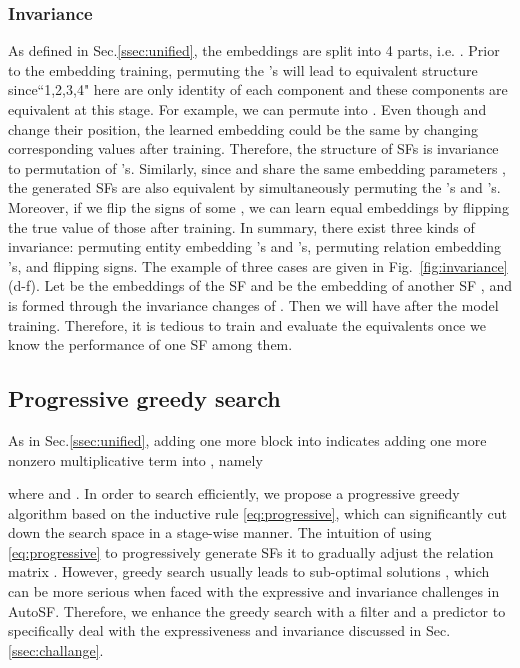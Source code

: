 \documentclass[conference]{IEEEtran}
\begin{document}
\subsubsection{Invariance}
As defined in Sec.\ref{ssec:unified},
the embeddings are split into 4 parts, i.e.
.
Prior to the embedding training,
permuting the 's will lead to equivalent structure 
since``1,2,3,4" here are only identity of each component
and these components are equivalent at this stage.
For example, we can permute  into .
Even though  and  change their position,
the learned embedding could be the same by changing corresponding values after training.
Therefore, the structure of SFs is invariance to permutation of 's.
Similarly,
since  and  share the same embedding parameters , 
the generated SFs are also equivalent by simultaneously permuting the 's and 's.
Moreover, if we flip the signs of some ,
we can learn equal embeddings by flipping the true value of  those  after training.
In summary,
there exist three kinds of invariance: 
permuting entity embedding 's and 's,
permuting relation embedding 's, 
and flipping signs.
The example of three cases are given in Fig.~\ref{fig:invariance}(d-f).
Let  be the embeddings of the SF 
 and  be the embedding of another SF ,
 and  is formed through the invariance changes of .
 Then we will have  
 after the model training.
 Therefore,
it is tedious to train and evaluate the equivalents once we know the performance of one SF among them.


\subsection{Progressive greedy search}
\label{ssec:greedy}

As in Sec.\ref{ssec:unified},
adding one more block into  indicates adding
one more nonzero multiplicative term into ,
namely

where  and .
In order to search efficiently, 
we propose a progressive greedy algorithm based on the inductive rule \eqref{eq:progressive},
which can significantly cut down the search space in a stage-wise manner.
The intuition of using \eqref{eq:progressive} to progressively generate SFs it to
gradually adjust the relation matrix .
However,
greedy search usually leads to sub-optimal solutions \cite{tropp2004greed},
which can be more serious when faced with the expressive and invariance challenges in AutoSF. 
Therefore,
we enhance the greedy search with a filter and a predictor
to specifically deal with  the expressiveness and invariance
discussed in Sec.\ref{ssec:challange}.
\end{document}
